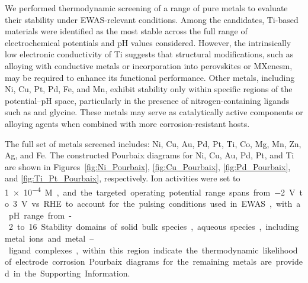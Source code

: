 \documentclass[journal=jacsat,manuscript=article]{achemso}
\begin{document}

We performed thermodynamic screening of a range of pure metals to evaluate their stability under EWAS-relevant conditions. Among the candidates, Ti-based materials were identified as the most stable across the full range of electrochemical potentials and pH values considered. However, the intrinsically low electronic conductivity of Ti suggests that structural modifications, such as alloying with conductive metals or incorporation into perovskites or MXenesm, may be required to enhance its functional performance. Other metals, including Ni, Cu, Pt, Pd, Fe, and Mn, exhibit stability only within specific regions of the potential–pH space, particularly in the presence of nitrogen-containing ligands such as  and glycine. These metals may serve as catalytically active components or alloying agents when combined with more corrosion-resistant hosts. 

The full set of metals screened includes: Ni, Cu, Au, Pd, Pt, Ti, Co, Mg, Mn, Zn, Ag, and Fe. The constructed Pourbaix diagrams for Ni, Cu, Au, Pd, Pt, and Ti are shown in Figures~\ref{fig:Ni_Pourbaix}, \ref{fig:Cu_Pourbaix}, \ref{fig:Pd_Pourbaix}, and \ref{fig:Ti_Pt_Pourbaix}, respectively. Ion activities were set to \SI{1e-4}M, and the targeted operating potential range spans from \SI{-2}{V} to \SI{3}{V} vs. RHE to account for the pulsing conditions used in EWAS, with a pH range from -2 to 16. Stability domains of solid bulk species, aqueous species, including metal ions and metal–ligand complexes, within this region indicate the thermodynamic likelihood of electrode corrosion. Pourbaix diagrams for the remaining metals are provided in the Supporting Information.
\end{document}
